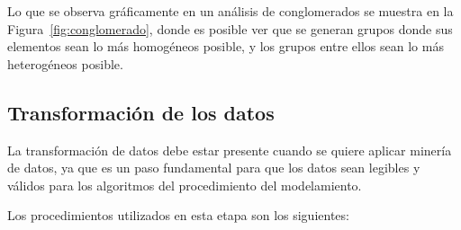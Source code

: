 Lo que se observa gráficamente en un análisis de conglomerados se muestra en la Figura~\ref{fig:conglomerado}, donde es posible ver que se generan grupos donde sus elementos sean lo más homogéneos posible, y los grupos entre ellos sean lo más heterogéneos posible. 

\subsection{Transformación de los datos}
La transformación de datos debe estar presente cuando se quiere aplicar minería de datos, ya que es un paso fundamental para que los datos sean legibles y válidos para los algoritmos del procedimiento del modelamiento.

Los procedimientos utilizados en esta etapa son los siguientes:

